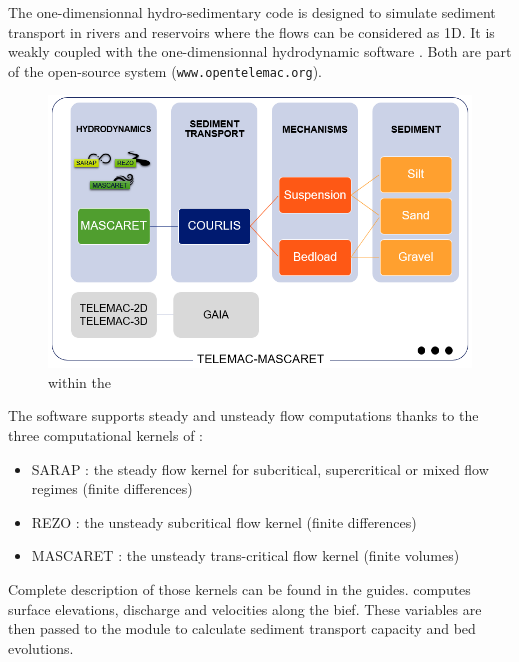 
The one-dimensionnal hydro-sedimentary code \courlis is designed to simulate sediment transport in rivers and reservoirs where the flows can be considered as 1D. It is weakly coupled with the one-dimensionnal hydrodynamic software \mascaret. Both are part of the open-source system \telemacsystem (\texttt{www.opentelemac.org}).

\begin{figure}[htb!]
    \centering
    \includegraphics[width=\textwidth]{./graphics/telemac.png}
    \caption{\courlis within the \telemacsystem}
    \label{fig:telemac}
\end{figure}

The software supports steady and unsteady flow computations thanks to the three computational kernels of \mascaret :
\begin{itemize}
	\item SARAP : the steady flow kernel for subcritical, supercritical or mixed flow regimes (finite differences)
	\item REZO : the unsteady subcritical flow kernel (finite differences)
	\item MASCARET : the unsteady trans-critical flow kernel (finite volumes)
\end{itemize}
Complete description of those kernels can be found in the \mascaret guides. \mascaret computes surface elevations, discharge and velocities along the bief. These variables are then passed to the module \courlis to calculate sediment transport capacity and bed evolutions.  

